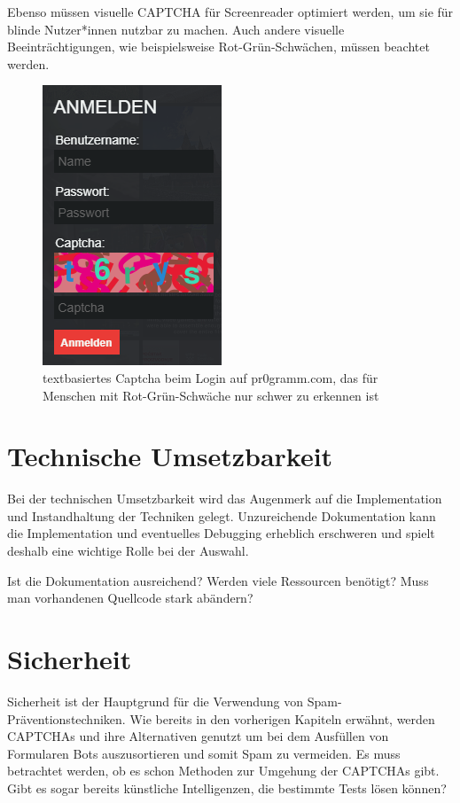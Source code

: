 Ebenso müssen visuelle CAPTCHA für Screenreader optimiert werden, um sie für blinde Nutzer*innen nutzbar zu machen. 
Auch andere visuelle Beeinträchtigungen, wie beispielsweise Rot-Grün-Schwächen, müssen beachtet werden.

\begin{figure}
    \centering
    \includegraphics{gfx/mygraphics/pr0grammcaptcha.png}
    \caption{textbasiertes Captcha beim Login auf pr$0$gramm.com, das für Menschen mit Rot-Grün-Schwäche nur schwer zu erkennen ist}
    \label{fig:pr0grammcaptcha}
\end{figure}

\section{Technische Umsetzbarkeit}
\label{ch:matrix:tu}

Bei der technischen Umsetzbarkeit wird das Augenmerk auf die Implementation und Instandhaltung der Techniken gelegt. 
Unzureichende Dokumentation kann die Implementation und eventuelles Debugging erheblich erschweren 
und spielt deshalb eine wichtige Rolle bei der Auswahl. 

Ist die Dokumentation ausreichend? Werden viele Ressourcen benötigt? Muss man vorhandenen Quellcode stark abändern?

\section{Sicherheit}
\label{ch:matrix:sicherheit}
Sicherheit ist der Hauptgrund für die Verwendung von Spam-Präventionstechniken. 
Wie bereits in den vorherigen Kapiteln erwähnt, werden CAPTCHAs und ihre Alternativen genutzt um bei dem Ausfüllen von Formularen Bots auszusortieren
und somit Spam zu vermeiden.
Es muss betrachtet werden, ob es schon Methoden zur Umgehung der CAPTCHAs gibt. 
Gibt es sogar bereits künstliche Intelligenzen, die bestimmte Tests lösen können?

